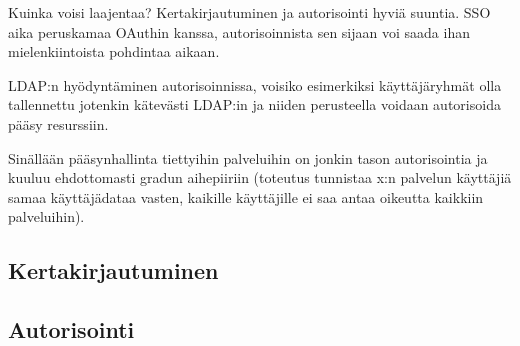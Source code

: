 Kuinka voisi laajentaa? Kertakirjautuminen ja autorisointi hyviä suuntia. SSO aika peruskamaa OAuthin kanssa, autorisoinnista sen sijaan voi saada ihan mielenkiintoista pohdintaa aikaan.

LDAP:n hyödyntäminen autorisoinnissa, voisiko esimerkiksi käyttäjäryhmät olla tallennettu jotenkin kätevästi LDAP:in ja niiden perusteella voidaan autorisoida pääsy resurssiin.

Sinällään pääsynhallinta tiettyihin palveluihin on jonkin tason autorisointia ja kuuluu ehdottomasti gradun aihepiiriin (toteutus tunnistaa x:n palvelun käyttäjiä samaa käyttäjädataa vasten, kaikille käyttäjille ei saa antaa oikeutta kaikkiin palveluihin).


\subsection{Kertakirjautuminen}

\subsection{Autorisointi}
